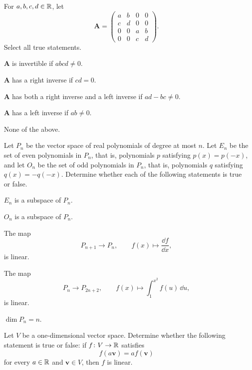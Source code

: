 \begin{problem}
For $a,b,c,d\in\mathbb{R}$, let
\[
\mathbf A=
\begin{pmatrix}
a&b&0&0\\
c&d&0&0\\
0&0&a&b\\
0&0&c&d
\end{pmatrix}.
\]
Select all true statements.
\begin{problemchoices}
\item $\mathbf A$ is invertible if $abcd\ne0$.
\item $\mathbf A$ has a right inverse if $cd=0$.
\item $\mathbf A$ has both a right inverse and a left inverse if $ad-bc\ne0$.
\item $\mathbf A$ has a left inverse if $ab\ne0$.
\item None of the above.
\end{problemchoices}
\end{problem}

\begin{problem}
Let $P_n$ be the vector space of real polynomials of degree at most $n$. Let $E_n$ be the set of even polynomials in $P_n$, that is, polynomials $p$ satisfying $p(x)=p(-x)$, and let $O_n$ be the set of odd polynomials in $P_n$, that is, polynomials $q$ satisfying $q(x)=-q(-x)$. Determine whether each of the following statements is true or false.
\begin{problemchoices}
\item $E_n$ is a subspace of $P_n$.
\item $O_n$ is a subspace of $P_n$.
\item The map
\[
P_{n+1}\to P_n,
\qquad
f(x)\mapsto \frac{\dd f}{\dd x},
\]
is linear.
\item The map
\[
P_n\to P_{2n+2},
\qquad
f(x)\mapsto \int_1^{x^2}f(u)\,\dd u,
\]
is linear.
\item $\dim P_n=n$.
\end{problemchoices}
\end{problem}

\begin{problem}
Let $V$ be a one-dimensional vector space. Determine whether the following statement is true or false: if $f\colon V\to\mathbb{R}$ satisfies
\[
f(a\mathbf v)=a f(\mathbf v)
\]
for every $a\in\mathbb{R}$ and $\mathbf v\in V$, then $f$ is linear.
\end{problem}

